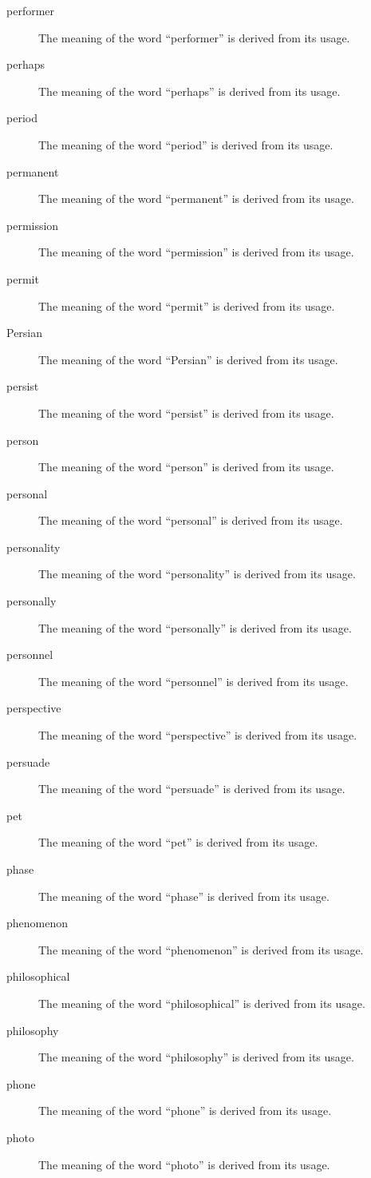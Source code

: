 \documentclass[12pt, letterpaper]{memoir}
\begin{document}
\begin{description}
\item[performer] The meaning of the word ``performer'' is derived from its usage.
\item[perhaps] The meaning of the word ``perhaps'' is derived from its usage.
\item[period] The meaning of the word ``period'' is derived from its usage.
\item[permanent] The meaning of the word ``permanent'' is derived from its usage.
\item[permission] The meaning of the word ``permission'' is derived from its usage.
\item[permit] The meaning of the word ``permit'' is derived from its usage.
\item[Persian] The meaning of the word ``Persian'' is derived from its usage.
\item[persist] The meaning of the word ``persist'' is derived from its usage.
\item[person] The meaning of the word ``person'' is derived from its usage.
\item[personal] The meaning of the word ``personal'' is derived from its usage.
\item[personality] The meaning of the word ``personality'' is derived from its usage.
\item[personally] The meaning of the word ``personally'' is derived from its usage.
\item[personnel] The meaning of the word ``personnel'' is derived from its usage.
\item[perspective] The meaning of the word ``perspective'' is derived from its usage.
\item[persuade] The meaning of the word ``persuade'' is derived from its usage.
\item[pet] The meaning of the word ``pet'' is derived from its usage.
\item[phase] The meaning of the word ``phase'' is derived from its usage.
\item[phenomenon] The meaning of the word ``phenomenon'' is derived from its usage.
\item[philosophical] The meaning of the word ``philosophical'' is derived from its usage.
\item[philosophy] The meaning of the word ``philosophy'' is derived from its usage.
\item[phone] The meaning of the word ``phone'' is derived from its usage.
\item[photo] The meaning of the word ``photo'' is derived from its usage.

\end{description}
\end{document}
